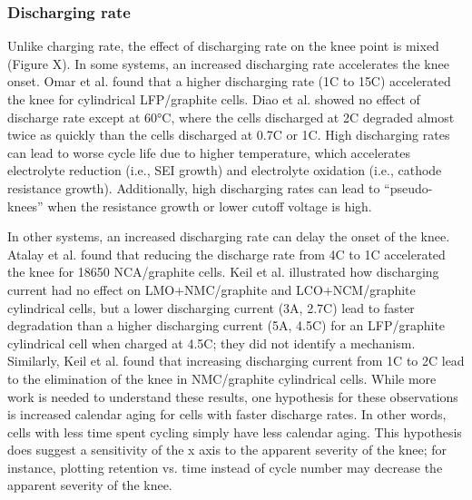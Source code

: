 \documentclass{article}
\begin{document}
\subsubsection{Discharging rate}

Unlike charging rate, the effect of discharging rate on the knee point is mixed (Figure X).
In some systems, an increased discharging rate
accelerates the knee onset.
Omar et al.\cite{omar_lithium_2014} found that a higher discharging rate (1C to 15C) accelerated the knee for cylindrical LFP/graphite cells.
Diao et al.\cite{diao_accelerated_2019} showed no effect of discharge rate except at 60°C, where the cells discharged at 2C degraded almost twice as quickly than the cells discharged at 0.7C or 1C.
High discharging rates can lead to worse cycle life due to higher temperature, which accelerates electrolyte reduction (i.e., SEI growth) and electrolyte oxidation (i.e., cathode resistance growth). Additionally, high discharging rates can lead to ``pseudo-knees'' when the resistance growth or lower cutoff voltage is high.

In other systems, an increased discharging rate can delay the onset of the knee.
Atalay et al.\cite{atalay_theory_2020} found that reducing the discharge rate from 4C to 1C accelerated the knee for 18650 NCA/graphite cells.
Keil et al.\cite{keil_charging_2016} illustrated how discharging current had no effect on LMO+NMC/graphite and LCO+NCM/graphite cylindrical cells, but a lower discharging current (3A, 2.7C) lead to faster degradation than a higher discharging current (5A, 4.5C) for an LFP/graphite cylindrical cell when charged at 4.5C; they did not identify a mechanism. 
Similarly, Keil et al.\cite{keil_linear_2019} found that increasing discharging current from 1C to 2C lead to the elimination of the knee in NMC/graphite cylindrical cells.
While more work is needed to understand these results, one hypothesis for these observations is increased calendar aging for cells with faster discharge rates.
In other words, cells with less time spent cycling simply have less calendar aging. This hypothesis does suggest a sensitivity of the x axis to the apparent severity of the knee; for instance, plotting retention vs. time instead of cycle number may decrease the apparent severity of the knee.
\end{document}
